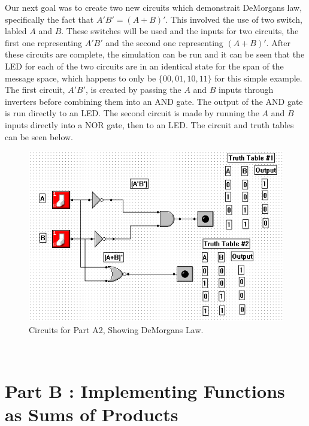 \documentclass[a4paper,11pt]{article}
\begin{document}
Our next goal was to create two new circuits which demonstrait DeMorgans law, specifically the fact that \(A'B' = (A+B)'\). This involved the use of two switch, labled $A$ and $B$. These switches will be used and the inputs for two circuits, the first one representing $A'B'$ and the second one representing $(A+B)'$. After these circuits are complete, the simulation can be run and it can be seen that the LED for each of the two circuits are in an identical state for the span of the message space, which happens to only be $ \lbrace 00, 01, 10, 11 \rbrace $ for this simple example. The first circuit, $A'B'$, is created by passing the $A$ and $B$ inputs through inverters before combining them into an AND gate. The output of the AND gate is run directly to an LED. The second circuit is made by running the $A$ and $B$ inputs directly into a NOR gate, then to an LED. The circuit and truth tables can be seen below. \\
\begin{figure}[h!]
   \centering
     \includegraphics[width=5in]{PartADM}
   \caption{Circuits for Part A2, Showing DeMorgans Law.}
   \label{fig:map}
\end{figure}  \\

\section{Part B : Implementing Functions as Sums of Products}
\end{document}
